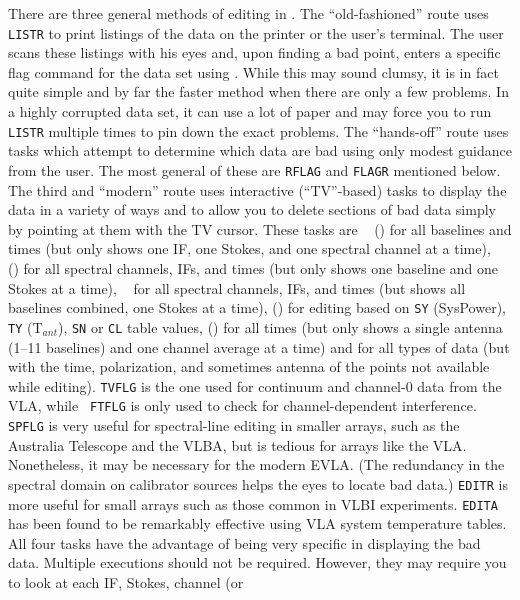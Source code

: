      There are three general methods of editing in \hbox{\AIPS}.  The
``old-fashioned'' route uses {\tt LISTR} to print listings of the data
on the printer or the user's terminal.  The user scans these listings
with his eyes and, upon finding a bad point, enters a specific flag
command for the data set using {\tt {}}\@.  While this
may sound clumsy, it is in fact quite simple and by far the faster
method when there are only a few problems.  In a highly corrupted data
set, it can use a lot of paper and may force you to run {\tt LISTR}
multiple times to pin down the exact problems.  The ``hands-off''
route uses tasks which attempt to determine which data are bad using
only modest guidance from the user.  The most general of these are
{\tt RFLAG} and {\tt FLAGR} mentioned below.  The third and ``modern''
route uses interactive (``TV''-based) tasks to display the data in a
variety of ways and to allow you to delete sections of bad data simply
by pointing at them with the TV cursor.  These tasks are {\tt
{}} () for all baselines and times (but only shows
one IF, one Stokes, and one spectral channel at a time), {\tt
{}} () for all spectral channels, IFs, and times
(but only shows one baseline and one Stokes at a time),  {\tt
{}} for all spectral channels, IFs, and times (but shows all
baselines combined, one Stokes at a time), {\tt {}}
() for editing based on {\tt SY} (SysPower), {\tt TY}
(T$_{ant}$), {\tt SN} or {\tt CL} table values,  {\tt {}}
() for all times (but only shows a single antenna (1--11
baselines) and one channel average at a time) and {\tt {}}
for all types of data (but with the time, polarization, and sometimes
antenna of the points not available while editing).  {\tt TVFLG} is
the one used for continuum and channel-0 data from the VLA, while {\tt
FTFLG} is only used to check for channel-dependent interference.  {\tt
SPFLG} is very useful for spectral-line editing in smaller arrays,
such as the Australia Telescope and the VLBA, but is tedious for
arrays like the VLA.  Nonetheless, it may be necessary for the modern
EVLA\@.  (The redundancy in the spectral domain on calibrator sources
helps the eyes to locate bad data.)  {\tt EDITR} is more useful for
small arrays such as those common in VLBI experiments.  {\tt EDITA}
has been found to be remarkably effective using VLA system temperature
tables.  All four tasks have the advantage of being very specific in
displaying the bad data.  Multiple executions should not be required.
However, they may require you to look at each IF, Stokes, channel (or

